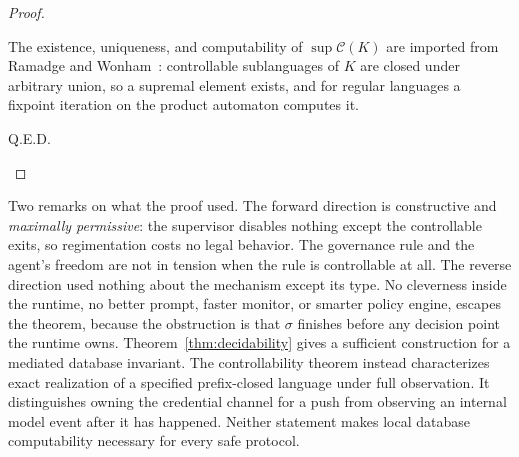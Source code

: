 \documentclass[11pt,a4paper]{article}
\theoremstyle{definition}
\theoremstyle{remark}
\begin{document}
\begin{proof}
\begin{description}[leftmargin=2.6em,style=nextline,itemsep=2pt]
\item[$.$] The existence, uniqueness, and computability of
  $\sup{}(K)$ are imported from Ramadge and Wonham~: controllable
  sublanguages of $K$ are closed under arbitrary union, so a supremal element exists, and for
  regular languages a fixpoint iteration on the product automaton computes it.
\item[$.$] \textsc{Q.E.D.}
\end{description}
\end{proof}

Two remarks on what the proof used. The forward direction is constructive and \emph{maximally
permissive}: the supervisor disables nothing except the controllable exits, so regimentation
costs no legal behavior. The governance rule and the agent's freedom are not in tension when
the rule is controllable at all. The reverse direction used nothing about the mechanism
except its type. No cleverness inside the runtime, no better prompt, faster monitor, or
smarter policy engine, escapes the theorem, because the obstruction is that $\sigma$ finishes
before any decision point the runtime owns. Theorem~\ref{thm:decidability} gives a sufficient
construction for a mediated database invariant. The controllability theorem
instead characterizes exact realization of a specified prefix-closed language
under full observation. It distinguishes owning the credential channel for a
push from observing an internal model event after it has happened. Neither
statement makes local database computability necessary for every safe protocol.
\end{document}
